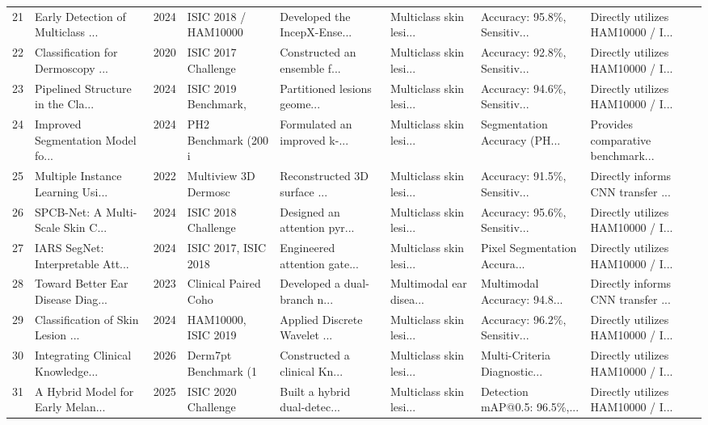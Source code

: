 \documentclass[11pt,a4paper]{article}
\begin{document}
\begin{small}
\begin{longtable}{p{0.5cm} p{2.2cm} p{0.8cm} p{1.8cm} p{2.0cm} p{2.0cm} p{2.0cm} p{2.5cm}}
21 & Early Detection of Multiclass ... & 2024 & ISIC 2018 / HAM10000 & Developed the IncepX-Ense... & Multiclass skin lesi... & Accuracy: 95.8\%, Sensitiv... & Directly utilizes HAM10000 / I... \\
22 & Classification for Dermoscopy ... & 2020 & ISIC 2017 Challenge  & Constructed an ensemble f... & Multiclass skin lesi... & Accuracy: 92.8\%, Sensitiv... & Directly utilizes HAM10000 / I... \\
23 & Pipelined Structure in the Cla... & 2024 & ISIC 2019 Benchmark, & Partitioned lesions geome... & Multiclass skin lesi... & Accuracy: 94.6\%, Sensitiv... & Directly utilizes HAM10000 / I... \\
24 & Improved Segmentation Model fo... & 2024 & PH2 Benchmark (200 i & Formulated an improved k-... & Multiclass skin lesi... & Segmentation Accuracy (PH... & Provides comparative benchmark... \\
25 & Multiple Instance Learning Usi... & 2022 & Multiview 3D Dermosc & Reconstructed 3D surface ... & Multiclass skin lesi... & Accuracy: 91.5\%, Sensitiv... & Directly informs CNN transfer ... \\
26 & SPCB-Net: A Multi-Scale Skin C... & 2024 & ISIC 2018 Challenge  & Designed an attention pyr... & Multiclass skin lesi... & Accuracy: 95.6\%, Sensitiv... & Directly utilizes HAM10000 / I... \\
27 & IARS SegNet: Interpretable Att... & 2024 & ISIC 2017, ISIC 2018 & Engineered attention gate... & Multiclass skin lesi... & Pixel Segmentation Accura... & Directly utilizes HAM10000 / I... \\
28 & Toward Better Ear Disease Diag... & 2023 & Clinical Paired Coho & Developed a dual-branch n... & Multimodal ear disea... & Multimodal Accuracy: 94.8... & Directly informs CNN transfer ... \\
29 & Classification of Skin Lesion ... & 2024 & HAM10000, ISIC 2019  & Applied Discrete Wavelet ... & Multiclass skin lesi... & Accuracy: 96.2\%, Sensitiv... & Directly utilizes HAM10000 / I... \\
30 & Integrating Clinical Knowledge... & 2026 & Derm7pt Benchmark (1 & Constructed a clinical Kn... & Multiclass skin lesi... & Multi-Criteria Diagnostic... & Directly utilizes HAM10000 / I... \\
31 & A Hybrid Model for Early Melan... & 2025 & ISIC 2020 Challenge  & Built a hybrid dual-detec... & Multiclass skin lesi... & Detection mAP@0.5: 96.5\%,... & Directly utilizes HAM10000 / I... \\

\end{longtable}
\end{small}
\end{document}
